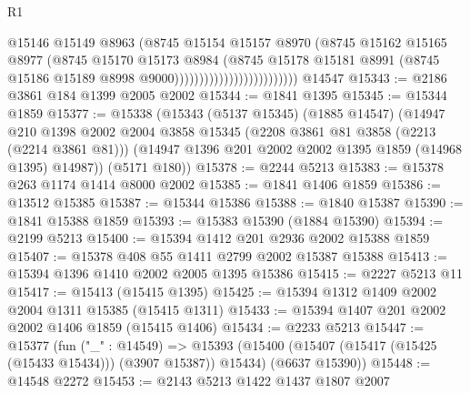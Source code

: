 \begin{lexlean}{R1}
\begin{coremodule}
                                            @15146
                                            @15149
                                            @8963
                                            (@8745
                                              @15154
                                              @15157
                                              @8970
                                              (@8745
                                                @15162
                                                @15165
                                                @8977
                                                (@8745
                                                  @15170
                                                  @15173
                                                  @8984
                                                  (@8745
                                                    @15178
                                                    @15181
                                                    @8991
                                                    (@8745
                                                      @15186
                                                      @15189
                                                      @8998
                                                      @9000)))))))))))))))))))))))))
    @14547
@15343 := @2186 @3861 @184 @1399 @2005 @2002
@15344 := @1841 @1395
@15345 := @15344 @1859
@15377 := @15338
    (@15343
      (@5137 @15345)
      (@1885 @14547)
      (@14947
        @210
        @1398
        @2002
        @2004
        @3858
        @15345
        (@2208 @3861 @81 @3858 (@2213 (@2214 @3861 @81)))
        (@14947 @1396 @201 @2002 @2002 @1395 @1859 (@14968 @1395) @14987))
      (@5171 @180))
@15378 := @2244 @5213
@15383 := @15378 @263 @1174 @1414 @8000 @2002
@15385 := @1841 @1406 @1859
@15386 := @13512 @15385
@15387 := @15344 @15386
@15388 := @1840 @15387
@15390 := @1841 @15388 @1859
@15393 := @15383 @15390 (@1884 @15390)
@15394 := @2199 @5213
@15400 := @15394 @1412 @201 @2936 @2002 @15388 @1859
@15407 := @15378 @408 @55 @1411 @2799 @2002 @15387 @15388
@15413 := @15394 @1396 @1410 @2002 @2005 @1395 @15386
@15415 := @2227 @5213 @11
@15417 := @15413 (@15415 @1395)
@15425 := @15394 @1312 @1409 @2002 @2004 @1311 @15385 (@15415 @1311)
@15433 := @15394 @1407 @201 @2002 @2002 @1406 @1859 (@15415 @1406)
@15434 := @2233 @5213
@15447 := @15377
    (fun ("_" : @14549) =>
    @15393 (@15400 (@15407 (@15417 (@15425 (@15433 @15434))) (@3907 @15387)) @15434) (@6637 @15390))
@15448 := @14548 @2272
@15453 := @2143 @5213 @1422 @1437 @1807 @2007

\end{coremodule}
\end{lexlean}
